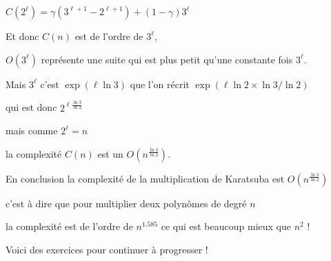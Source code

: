 $C(2^\ell) = \gamma (3^{\ell+1}-2^{\ell+1}) +(1-\gamma)3^\ell$


\change

Et donc $C(n)$ est de l'ordre de $3^\ell$, 

$O(3^\ell)$ représente une suite qui est plus petit qu'une constante fois $3^\ell$.

\change


Mais $3^\ell$ c'est $\exp (\ell \ln 3)$ que l'on récrit $\exp (\ell \ln 2 \times \ln 3 / \ln 2)$

qui est donc $2^{\ell \frac{\ln 3}{\ln 2}}$ 

\change

mais comme $2^\ell=n$ 

la complexité $C(n)$ est un $O(n^\frac{\ln 3}{\ln 2})$.

\change

En conclusion la complexité de la multiplication de Karatsuba est 
$O(n^\frac{\ln 3}{\ln 2})$ 

c'est à dire que pour multiplier deux polynômes de degré $n$

la complexité est de l'ordre de $n^{1.585}$ ce qui est beaucoup mieux que $n^2$ !


\diapo

Voici des exercices pour continuer à progresser !


